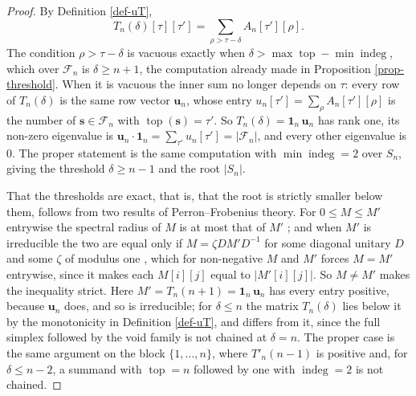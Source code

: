 \documentclass[11pt, a4paper, abstract=yes]{scrartcl}
\theoremstyle{definition}
\theoremstyle{remark}
\theoremstyle{plain}
\newcommand{\vek}[1]{\boldsymbol{#1}}
\newcommand{\indeg}{\operatorname{indeg}}
\newcommand{\tp}{\operatorname{top}}
\let\autocite\cite
\begin{document}
\begin{proof}
By Definition \ref{def-uT},
\[
  T_n(\delta)[\tau][\tau']=\sum_{\rho>\tau-\delta}A_n[\tau'][\rho] .
\]
The
condition \(\rho>\tau-\delta\) is vacuous exactly when \(\delta>\max\tp-\min\indeg\), which over
\(\mathcal F_n\) is \(\delta\ge n+1\), the computation already made in
Proposition \ref{prop-threshold}. When it is vacuous the inner sum no longer depends on \(\tau\):
every row of \(T_n(\delta)\) is the same row vector \(\vek u_n\), whose entry
\(u_n[\tau']=\sum_\rho A_n[\tau'][\rho]\) is the number of \(\vek s\in\mathcal F_n\) with
\(\tp(\vek s)=\tau'\). So \(T_n(\delta)=\vek1_n\,\vek u_n\) has rank one, its non-zero eigenvalue is
\(\vek u_n\cdot\vek1_n=\sum_{\tau'}u_n[\tau']=|\mathcal F_n|\), and
every other eigenvalue is \(0\). The proper statement is the same computation with \(\min\indeg=2\)
over \(S_n\), giving the threshold \(\delta\ge n-1\) and the root \(|S_n|\).

That the thresholds are exact, that is, that the root is strictly smaller below them, follows from
two results of Perron--Frobenius theory. For \(0\le M\le M'\) entrywise the spectral radius of
\(M\) is at most that of \(M'\) \autocite[Corollary 8.1.19]{HornJohnson2013}; and when \(M'\) is
irreducible the two are equal only if \(M=\zeta DM'D^{-1}\) for some diagonal unitary \(D\) and
some \(\zeta\) of modulus one \autocite[Theorem 8.4.5]{HornJohnson2013}, which for non-negative
\(M\) and \(M'\) forces \(M=M'\) entrywise, since it makes each \(M[i][j]\) equal to
\(|M'[i][j]|\). So \(M\ne M'\) makes the inequality strict.
Here \(M'=T_n(n+1)=\vek1_n\,\vek u_n\) has every entry positive,
because \(\vek u_n\) does, and so is irreducible; for \(\delta\le n\) the matrix \(T_n(\delta)\) lies
below it by the monotonicity in Definition \ref{def-uT}, and differs from it, since the full simplex
followed by the void family is not chained at \(\delta=n\). The proper case is the same argument on
the block \(\lbrace1,\dots,n\rbrace\), where \(T'_n(n-1)\) is positive and, for \(\delta\le n-2\), a
summand with \(\tp=n\) followed by one with \(\indeg=2\) is not chained.
\end{proof}
\end{document}

